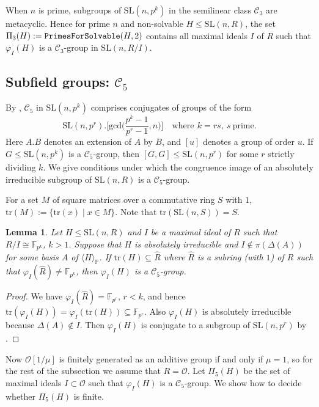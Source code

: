 \documentclass[11pt]{amsart}
\newtheorem{lemma}[theorem]{Lemma}
\theoremstyle{definition}
\theoremstyle{remark}
\newcommand{\F}{\mathbb{F}}
\renewcommand{\P}{\mathbb{P}}
\newcommand{\SL}{\mathrm{SL}}
\newcommand{\tr}{\mathrm{tr}}
\newcommand{\calc}{\mathscr{C}}
\begin{document}
When $n$ is prime, subgroups of $\SL(n, p^k)$ in the semilinear 
class $\calc_3$ are metacyclic. Hence for prime $n$ and 
non-solvable  $H\leq \SL(n,R)$, the set $\Pi_3(H):= 
{\tt PrimesForSolvable}(H,2)$ contains all maximal ideals $I$ 
of $R$ such that $\varphi_I(H)$ is a $\calc_3$-group in
 $\SL(n, R/I)$.

\subsection{Subfield groups: $\calc_5$} 
\label{Class5}

By \cite[Table~2.8]{Brayetal}, $\calc_5$ in $\SL(n, p^k)$
comprises conjugates of groups of the form
\[
\SL(n, p^r) . \big[
\mathrm{gcd}
\big({\textstyle \frac{p^k-1}{p^r-1}}, n \big) 
\big] \quad \text{where} \ \, k=rs,  \ s \ \text{prime}.
\]
Here $A.B$ denotes an extension of $A$ by $B$, and $[u]$ denotes
a group of order $u$. If $G\leq \SL(n,p^k)$ is a $\calc_5$-group, 
then $[G,G]\leq \SL(n,p^r)$ for some $r$ strictly dividing $k$.
We give conditions under which the  congruence image of an 
absolutely irreducible subgroup of $\SL(n, R)$ is a 
$\calc_5$-group. 

For a set $M$ of square matrices over a commutative ring 
$S$ with $1$, $\tr(M):= \{\tr(x) \mid \allowbreak x\in M\}$.
Note that $\tr(\SL(n, S)) = S$.
\begin{lemma} 
\label{Prec5}
Let $H \leq \SL(n, R)$ and $I$ be a maximal ideal of $R$ 
such that $R/I \cong \F_{p^k}$, $k > 1$. Suppose that $H$ 
is absolutely irreducible and $I\not \in \pi(\Delta(A))$ 
for some basis $A$ of $\langle H\rangle_\P$. If 
$\tr(H)\subseteq \widehat{R}$ where $\widehat{R}$ is a 
subring (with $1$) of $R$ such that 
$\varphi_I(\widehat{R}) \neq \F_{p^k}$, then $\varphi_I(H)$ 
is a $\calc_5$-group.
\end{lemma}
\begin{proof}
We have $\varphi_I(\widehat{R}) =\F_{p^r}$, $r<k$, and hence 
$\tr(\varphi_I(H)) = \varphi_I(\tr(H)) \subseteq \F_{p^r}$.
Also $\varphi_I(H)$ is absolutely irreducible because 
$\Delta(A) \notin I$. Then $\varphi_I(H)$ is conjugate to a 
subgroup of $\SL(n, p^r)$ by \cite[(9.14)]{IsaacsCT}.
\end{proof}

Now $\mathcal{O}[1/\mu]$
 is finitely generated as an additive group if and only if $\mu =1$,
so for the rest of the subsection we assume that $R=\mathcal O$. 
Let $\Pi_5(H)$ be the set of maximal 
ideals $I\subset \mathcal O$ such that $\varphi_I(H)$ is a 
$\calc_5$-group. We show how to decide whether $\Pi_5(H)$ is finite.
\end{document}
